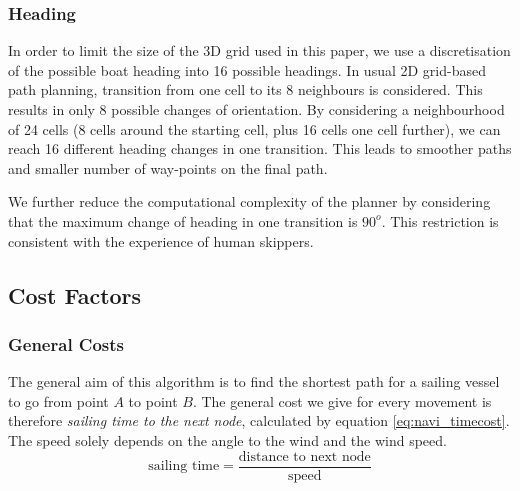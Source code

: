 \subsubsection{Heading}
In order to limit the size of the 3D grid used in this paper, we use a
discretisation of the possible boat heading into 16 possible headings. In usual
2D grid-based path planning, transition from one cell to its 8 neighbours is
considered. This results in only 8 possible changes of orientation. By
considering a neighbourhood of 24 cells (8 cells around the starting cell, plus
16 cells one cell further), we can reach 16 different heading changes in one
transition. This leads to smoother paths and smaller number of way-points on the
final path.

We further reduce the computational complexity of the planner by considering
that the maximum change of heading in one transition is $90^o$. This
restriction is consistent with the experience of human skippers. 
%
\subsection{Cost Factors}
\subsubsection{General Costs}
The general aim of this algorithm is to find the shortest path for a sailing vessel to go from point $A$ to point $B$. The general cost we give for every movement is therefore \textit{sailing time to the next node}, calculated by equation \ref{eq:navi_timecost}. The speed solely depends on the angle to the wind and the wind speed. 
\begin{equation}
 \text{sailing time} = \frac{\text{distance to next node}}{\text{speed}} 
\label{eq:navi_timecost}
\end{equation}
